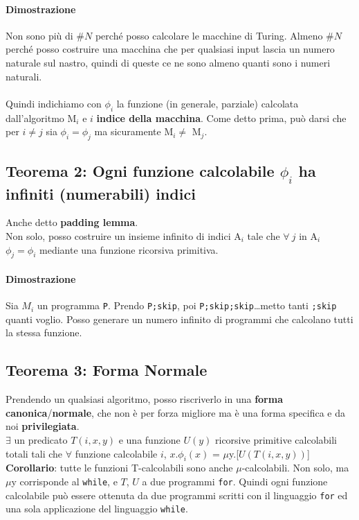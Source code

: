 \documentclass[10pt]{book}
\begin{document}
\paragraph{Dimostrazione} Non sono più di \#$N$ perché posso calcolare le macchine di Turing. Almeno \#$N$ perché posso costruire una macchina che per qualsiasi input lascia un numero naturale sul nastro, quindi di queste ce ne sono almeno quanti sono i numeri naturali.\\\\
Quindi indichiamo con $\phi_i$ la funzione (in generale, parziale) calcolata dall'algoritmo M$_i$ e $i$ \textbf{indice della macchina}. Come detto prima, può darsi che per $i \neq j$ sia $\phi_i = \phi_j$ ma sicuramente M$_i \neq$ M$_j$.
\subsection{Teorema 2: Ogni funzione calcolabile $\phi_i$ ha infiniti (numerabili) indici}
Anche detto \textbf{padding lemma}.\\
Non solo, posso costruire un insieme infinito di indici A$_i$ tale che $\forall\:j$ in A$_i$ $\phi_j = \phi_i$ mediante una funzione ricorsiva primitiva.
\paragraph{Dimostrazione} Sia $M_i$ un programma \texttt{P}. Prendo \texttt{P;skip}, poi \texttt{P;skip;skip}\ldots metto tanti \texttt{;skip} quanti voglio. Posso generare un numero infinito di programmi che calcolano tutti la stessa funzione.
\subsection{Teorema 3: Forma Normale}
Prendendo un qualsiasi algoritmo, posso riscriverlo in una \textbf{forma canonica}/\textbf{normale}, che non è per forza migliore ma è una forma specifica e da noi \textbf{privilegiata}.\\
$\exists$ un predicato $T(i, x, y)$ e una funzione $U(y)$ ricorsive primitive calcolabili totali tali che $\forall$ funzione calcolabile $i$, $x$.$\phi_i(x)$ = $\mu$y.[$U(T(i, x, y))$]\\
\textbf{Corollario}: tutte le funzioni T-calcolabili sono anche $\mu$-calcolabili. Non solo, ma $\mu$y corrisponde al \texttt{while}, e $T$, $U$ a due programmi \texttt{for}. Quindi ogni funzione calcolabile può essere ottenuta da due programmi scritti con il linguaggio \texttt{for} ed una sola applicazione del linguaggio \texttt{while}.
\end{document}
